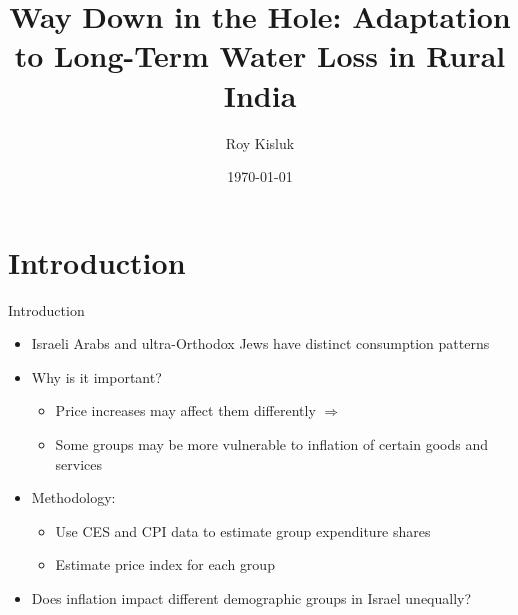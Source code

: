 \documentclass[10pt]{beamer}
\title[]{Way Down in the Hole: Adaptation to Long-Term Water Loss in Rural India}
\author[{\scriptsize Roy Kisluk}]{\scriptsize Roy Kisluk}
\institute[{\scriptsize Under the supervision of Dr.\ Tomer Ifergane}]{\scriptsize Under the supervision of Dr.\ Tomer Ifergane}
\date{\scriptsize \today}
\begin{document}

\begin{frame}[plain]
\end{frame}


\section{Introduction}
\begin{frame}
	{Introduction}
	\begin{itemize}
		\item Israeli Arabs and ultra-Orthodox Jews have distinct consumption patterns
		\item Why is it important?
		      \begin{itemize}
			      \item Price increases may affect them differently \(\Rightarrow\)
			      \item Some groups may be more vulnerable to inflation of certain goods and services
		      \end{itemize}
		\item Methodology:
		      \begin{itemize}
			      \item Use CES and CPI data to estimate group expenditure shares
			      \item Estimate price index for each group
		      \end{itemize}
		\item Does inflation impact different demographic groups in Israel unequally?
	\end{itemize}
\end{frame}
\end{document}
